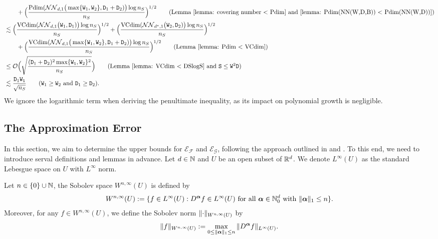 \begin{align*}
    &\qquad+ \Big(\frac{\mathrm{Pdim}(\mathcal{NN}_{d,1}\big(\max\{\mathtt{W}_1,\mathtt{W}_2\}, \mathtt{D}_1+\mathtt{D}_2)\big)\log n_S}{n_S}\Big)^{1/2} \tag{Lemma~\ref{lemma: covering number < Pdim} and \ref{lemma: Pdim(NN(W,D,B)) < Pdim(NN(W,D))}}\\
    &\lesssim \Big(\frac{\mathrm{VCdim}(\mathcal{NN}_{d,1}\big(\mathtt{W}_1, \mathtt{D}_1)\big)\log n_S}{n_S}\Big)^{1/2} + \Big(\frac{\mathrm{VCdim}(\mathcal{NN}_{d^*,1}\big(\mathtt{W}_2, \mathtt{D}_2)\big)\log n_S}{n_S}\Big)^{1/2} \\
    &\qquad + \Big(\frac{\mathrm{VCdim}(\mathcal{NN}_{d,1}\big(\max\{\mathtt{W}_1,\mathtt{W}_2\}, \mathtt{D}_1+\mathtt{D}_2)\big)\log n_S}{n_S}\Big)^{1/2} \tag{Lemma~\ref{lemma: Pdim < VCdim}}\\
    &\leq \mathcal{O}\Big(\sqrt{\frac{(\mathtt{D}_1 + \mathtt{D}_2)^2\max\{\mathtt{W_1}, \mathtt{W}_2\}^2}{n_S}}\Big) \tag{Lemma~\ref{lemma: VCdim < DSlogS} and $\mathtt{S} \leq \mathtt{W}^2\mathtt{D}$}\\
    &\lesssim \frac{\mathtt{D}_1\mathtt{W_1}}{\sqrt{n_S}} \tag{$\mathtt{W}_1 \geq \mathtt{W}_2$ and $\mathtt{D}_1 \geq \mathtt{D}_2$}.
\end{align*}
We ignore the logarithmic term when deriving the penultimate inequality, as its impact on polynomial growth is negligible.


\subsection{The Approximation Error}\label{section: The Approximation Error}
In this section, we aim to determine the upper bounds for $\mathcal{E}_{\mathcal{F}}$ and $\mathcal{E}_{\mathcal{G}}$, following the approach outlined in \citet{yang2023nearly} and \citet{gao2024convergencecontinuousnormalizingflows}. To this end, we need to introduce serval definitions and lemmas in advance. Let $d \in \mathbb{N}$ and $U$ be an open subset of $\mathbb{R}^d$. We denote $L^\infty(U)$ as the standard Lebesgue space on $U$ with $L^\infty$ norm.
\begin{definition}
    Let $n \in \{0\}\cup\mathbb{N}$, the Sobolev space $W^{n, \infty}(U)$ is defined by
    \begin{align*}
        W^{n, \infty}(U) := \{f \in L^\infty(U): D^{\bm{\alpha}} f \in L^{\infty}(U) \text{ for all } \bm{\alpha} \in \mathbb{N}_0^{d} \text{ with } \Vert{\bm{\alpha}}\Vert_1 \leq n\}.
    \end{align*}
    Moreover, for any $f \in W^{n, \infty}(U)$, we define the Sobolev norm $\Vert{\cdot}\Vert_{W^{n, \infty}(U)}$ by
    \begin{align*}
        \Vert{f}\Vert_{W^{n, \infty}(U)} := \max_{0 \leq \Vert{\bm{\alpha}}\Vert_1 \leq n}\Vert{D^{\bm{\alpha}} f}\Vert_{L^\infty(U)}.
    \end{align*}
\end{definition}

